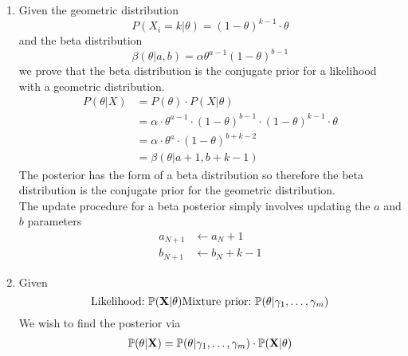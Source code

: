 \documentclass{article}
\begin{document}
\begin{enumerate}
\begin{enumerate}
            \item %
                Given the geometric distribution
                \begin{equation*}
                    P(X_i=k|\theta)= (1-\theta)^{k-1} \cdot \theta
                \end{equation*}
                and the beta distribution
                \begin{equation*}
                    \beta(\theta|a,b)= \alpha \theta^{a-1} (1-\theta)^{b-1}
                \end{equation*}
                we prove that the beta distribution is the conjugate prior
                for a likelihood with a geometric distribution.
                \begin{align*}
                    P(\theta|X)
                    &= P(\theta) \cdot P(X|\theta) \\
                    &= \alpha \cdot \theta^{a-1} \cdot (1-\theta)^{b-1} 
                        \cdot (1-\theta)^{k-1} \cdot \theta \\
                    &= \alpha \cdot \theta^{a} \cdot (1-\theta)^{b+k-2} \\
                    &= \beta(\theta|a+1, b+k-1) 
                \end{align*}
                The posterior has the form of a beta distribution so
                therefore the beta distribution is the conjugate prior for
                the geometric distribution. \\
                The update procedure for a beta posterior simply involves
                updating the \(a\) and \(b\) parameters
                \begin{align*}
                    a_{N+1} &\leftarrow a_N + 1 \\
                    b_{N+1} &\leftarrow b_N + k - 1
                \end{align*}
            \item %
              Given
              \begin{equation*}
                \textnormal{Likelihood:\ } \mathbb{P}(\mathbf{X}|\theta)
                \textnormal{Mixture prior:\ } \mathbb{P}(\theta|\gamma_1,\hdots,\gamma_m)
              \end{equation*}
              We wish to find the posterior via
              \begin{align*}
                \pr(\theta|\mathbf{X}) &= \pr(\theta|\gamma_1,\hdots,\gamma_m)
                \cdot \pr(\mathbf{X}|\theta) \\

\end{align*}
\end{enumerate}
\end{enumerate}
\end{document}
